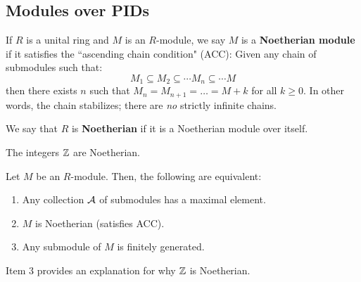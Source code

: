 \subsection{Modules over PIDs}

\begin{defn}
    If $ R $ is a unital ring and $ M $ is an $ R $-module,
    we say $ M $ is a \textbf{Noetherian module} if it satisfies the
    ``ascending chain condition" (ACC): \vsp
    Given any chain of submodules such that:
    \begin{equation*}
        M_{1} \subseteq M_{2} \subseteq \cdots M_{n} \subseteq \cdots M
    \end{equation*}
    then there exists $ n $ such that $ M_{n} = M_{n+1} = \dots = M+k $
    for all $ k \geq 0 $. \vsp
    In other words, the chain stabilizes; there are \textit{no} strictly
    infinite chains.
\end{defn}
We say that $R$ is \textbf{Noetherian} if it is a Noetherian module over itself.

\begin{xmp}[source=Primary Source Material]
    The integers $ \mathbb{Z} $ are Noetherian.
\end{xmp}

\begin{thm}
    Let $ M $ be an $ R $-module. Then, the following are equivalent:
    \begin{enumerate}
        \item Any collection $ \mathcal{A} $ of submodules has a maximal element.
        \item $ M $ is Noetherian (satisfies ACC).
        \item Any submodule of $ M $ is finitely generated.
    \end{enumerate}
\end{thm}
Item 3 provides an explanation for why $ \mathbb{Z} $ is Noetherian.

